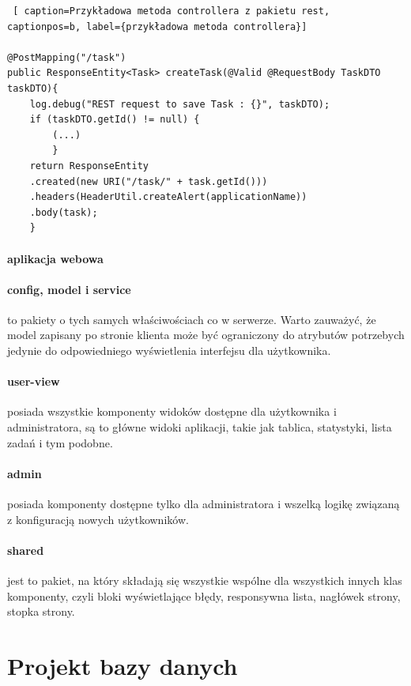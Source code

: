 \begin{lstlisting} [ caption=Przykładowa metoda controllera z pakietu rest, captionpos=b, label={przykładowa metoda controllera}]

@PostMapping("/task")
public ResponseEntity<Task> createTask(@Valid @RequestBody TaskDTO taskDTO){
	log.debug("REST request to save Task : {}", taskDTO);
	if (taskDTO.getId() != null) {
		(...)
		}
	return ResponseEntity
	.created(new URI("/task/" + task.getId()))
	.headers(HeaderUtil.createAlert(applicationName))
	.body(task);
	}

\end{lstlisting}

\paragraph{aplikacja webowa}
\paragraph{config, model i service} to pakiety o tych samych właściwościach co w serwerze. Warto zauważyć, że model zapisany po stronie klienta może być ograniczony do atrybutów potrzebych jedynie do odpowiedniego wyświetlenia interfejsu dla użytkownika. 
\paragraph{user-view} posiada wszystkie komponenty widoków dostępne dla użytkownika i administratora, są to główne widoki aplikacji, takie jak tablica, statystyki, lista zadań i tym podobne.
\paragraph{admin} posiada komponenty dostępne tylko dla administratora i wszelką logikę związaną z konfiguracją nowych użytkowników.
\paragraph{shared} jest to pakiet, na który składają się wszystkie wspólne dla wszystkich innych klas komponenty, czyli bloki wyświetlające błędy, responsywna lista, nagłówek strony, stopka strony. 

\section{Projekt bazy danych}

